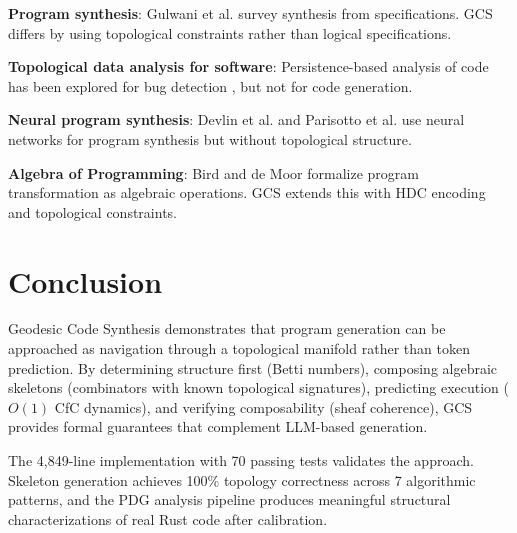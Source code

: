 \documentclass[11pt,a4paper]{article}
\begin{document}
\textbf{Program synthesis}: Gulwani et al. \cite{gulwani2017program} survey
synthesis from specifications. GCS differs by using topological constraints
rather than logical specifications.

\textbf{Topological data analysis for software}: Persistence-based analysis
of code has been explored for bug detection \cite{dlotko2019topological},
but not for code generation.

\textbf{Neural program synthesis}: Devlin et al. \cite{devlin2017robustfill}
and Parisotto et al. \cite{parisotto2017neuro} use neural networks for program
synthesis but without topological structure.

\textbf{Algebra of Programming}: Bird and de Moor \cite{bird1997algebra}
formalize program transformation as algebraic operations. GCS extends this
with HDC encoding and topological constraints.

\section{Conclusion}

Geodesic Code Synthesis demonstrates that program generation can be approached
as navigation through a topological manifold rather than token prediction.
By determining structure first (Betti numbers), composing algebraic skeletons
(combinators with known topological signatures), predicting execution ($O(1)$
CfC dynamics), and verifying composability (sheaf coherence), GCS provides
formal guarantees that complement LLM-based generation.

The 4,849-line implementation with 70 passing tests validates the approach.
Skeleton generation achieves 100\% topology correctness across 7 algorithmic
patterns, and the PDG analysis pipeline produces meaningful structural
characterizations of real Rust code after calibration.
\end{document}
